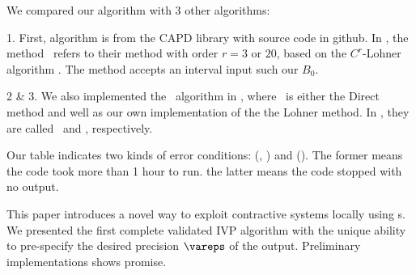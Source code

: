 	We compared our algorithm with 3 other algorithms:
	
	1. First, algorithm is from
	the CAPD library \cite{capd-homepage} with source code in github.
	In , the method \capdCr\ refers to their method
	 with order $r=3$ or $20$,
	based on the $C^r$-Lohner algorithm
	\cite{zgliczynski:lohner:02,capd:rigorousDynSys:21}.
	The method accepts an interval input such our $B_0$.
	
	2 \& 3. We also implemented the \simpleIVP\ algorithm 
	in , where \stepB\ is either the 
	Direct method  and
	well as our own implementation of the
	the Lohner method. In , they are called 
	\simpleIVPdirect\ and \simpleIVPlohner, respectively.  
	
	Our table indicates two kinds of error conditions:
	 (\simpleIVPdirect, \simpleIVPlohner)
	and  (\capdCr).
	The former means the code took more than 1 hour to run.
	the latter means the code stopped with no output.
	



	This paper introduces a novel way to exploit
	contractive systems locally using \lognorm s.
	We presented the first complete validated IVP 
	algorithm with the unique ability to pre-specify the
	desired precision $\vareps$ of the output. 
	Preliminary implementations shows promise.

    
